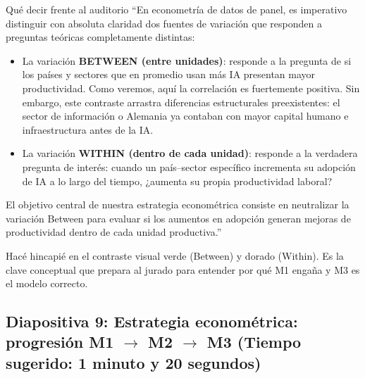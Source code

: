\documentclass[11pt,a4paper]{article}
\begin{document}
\begin{speechbox}{Qué decir frente al auditorio}
``En econometría de datos de panel, es imperativo distinguir con absoluta claridad dos fuentes de variación que responden a preguntas teóricas completamente distintas:
\begin{itemize}[itemsep=0.2em]
  \item La variación \textbf{BETWEEN (entre unidades)}: responde a la pregunta de si los países y sectores que en promedio usan más IA presentan mayor productividad. Como veremos, aquí la correlación es fuertemente positiva. Sin embargo, este contraste arrastra diferencias estructurales preexistentes: el sector de información o Alemania ya contaban con mayor capital humano e infraestructura antes de la IA.
  \item La variación \textbf{WITHIN (dentro de cada unidad)}: responde a la verdadera pregunta de interés: cuando un país--sector específico incrementa su adopción de IA a lo largo del tiempo, ¿aumenta su propia productividad laboral?
\end{itemize}

El objetivo central de nuestra estrategia econométrica consiste en neutralizar la variación Between para evaluar si los aumentos en adopción generan mejoras de productividad dentro de cada unidad productiva.''
\end{speechbox}

\begin{tipbox}
Hacé hincapié en el contraste visual verde (Between) y dorado (Within). Es la clave conceptual que prepara al jurado para entender por qué M1 engaña y M3 es el modelo correcto.
\end{tipbox}

\subsection*{Diapositiva 9: Estrategia econométrica: progresión M1 $\rightarrow$ M2 $\rightarrow$ M3 (Tiempo sugerido: 1 minuto y 20 segundos)}
\end{document}
